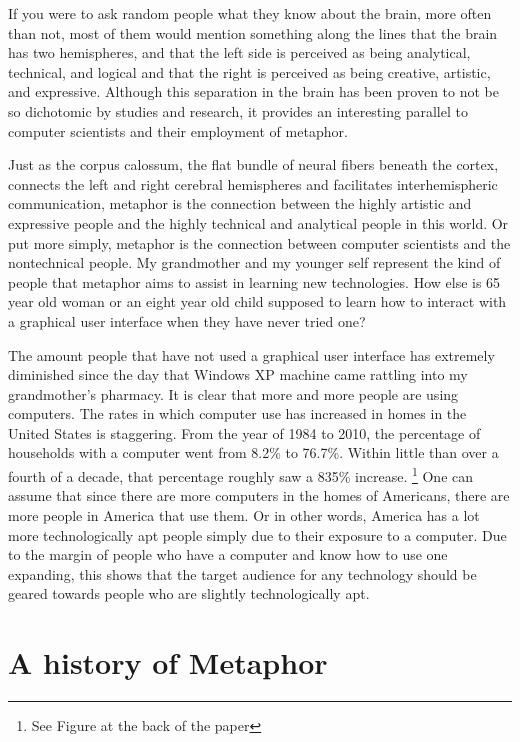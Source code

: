 \documentclass[11pt, oneside]{article}   	%
\begin{document}
If you were to ask random people what they know about the brain, more often than not, most of them would mention something along the lines that the brain has two hemispheres, and that the left side is perceived as being analytical, technical, and logical and that the right is perceived as being creative, artistic, and expressive. Although this separation in the brain has been proven to not be so dichotomic by studies and research, it provides an interesting parallel to computer scientists and their employment of metaphor.

Just as the corpus calossum, the flat bundle of neural fibers beneath the cortex, connects the left and right cerebral hemispheres and facilitates interhemispheric communication, metaphor is the connection between the highly artistic and expressive people and the highly  technical and analytical people in this world. Or put more simply, metaphor is the connection between computer scientists and the nontechnical people. My grandmother and my younger self represent the kind of people that metaphor aims to assist in learning new technologies. How else is 65 year old woman or an eight year old child supposed to learn how to interact with a graphical user interface when they have never tried one?

The amount people that have not used a graphical user interface has extremely diminished since the day that Windows XP machine came rattling into my grandmother's pharmacy. It is clear that more and more people are using computers. The rates in which computer use has increased in homes in the United States is staggering. From the year of 1984 to 2010, the percentage of households with a computer went from 8.2\% to 76.7\%. Within little than over a fourth of a decade, that percentage roughly saw a 835\% increase. \cite{computer-use} \footnote{See Figure at the back of the paper}
One can assume that since there are more computers in the homes of Americans, there are more people in America that use them. Or in other words, America has a lot more technologically apt people simply due to their exposure to a computer. Due to the margin of people who have a computer and know how to use one expanding, this shows that the target audience for any technology should be geared towards people who are slightly technologically apt.

\section{A history of Metaphor}
\end{document}
